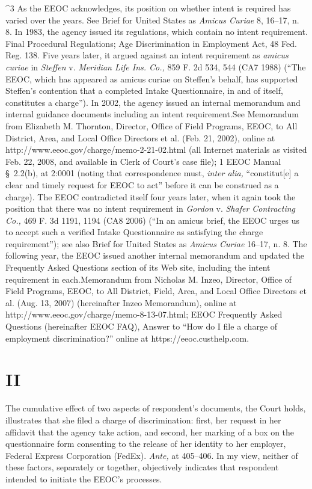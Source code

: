 ^3 As the EEOC acknowledges, its position on whether intent is required
has varied over the years. See Brief for United States as \emph{Amicus
Curiae} 8, 16--17, n. 8. In 1983, the agency issued its regulations,
which contain no intent requirement. Final Procedural Regulations;
Age Discrimination in Employment Act, 48 Fed. Reg. 138. Five years
later, it argued against an intent requirement as \emph{amicus curiae} in
\emph{Steffen} v. \emph{Meridian Life Ins. Co.,} 859 F. 2d 534, 544 (CA7
1988) (``The EEOC, which has appeared as amicus curiae on Steffen's
behalf, has supported Steffen's contention that a completed Intake
Questionnaire, in and of itself, constitutes a charge''). In
2002, the agency issued an internal memorandum and internal guidance
documents including an intent requirement.See Memorandum from
Elizabeth M. Thornton, Director, Office of Field Programs, EEOC, to
All District, Area, and Local Office Directors et al. (Feb. 21, 2002),
online at http://\newpage www.eeoc.gov/charge/memo-2-21-02.html (all
Internet materials as visited Feb. 22, 2008, and available in Clerk
of Court's case file); 1 EEOC Manual \S~2.2(b), at 2:0001 (noting
that correspondence must, \emph{inter alia,} ``constitut[e] a clear and
timely request for EEOC to act'' before it can be construed as a
charge). The EEOC contradicted itself four years later, when it again
took the position that there was no intent requirement in \emph{Gordon}
v. \emph{Shafer Contracting Co.,} 469 F. 3d 1191, 1194 (CA8 2006) (``In
an amicus brief, the EEOC urges us to accept such a verified Intake
Questionnaire as satisfying the charge requirement''); see also
Brief for United States as \emph{Amicus Curiae} 16--17, n. 8. The
following year, the EEOC issued another internal memorandum and updated
the Frequently Asked Questions section of its Web site, including
the intent requirement in each.Memorandum from Nicholas M. Inzeo,
Director, Office of Field Programs, EEOC, to All District, Field, Area,
and Local Office Directors et al. (Aug. 13, 2007) (hereinafter Inzeo
Memorandum), online at http://www.eeoc.gov/charge/memo-8-13-07.html;
EEOC Frequently Asked Questions (hereinafter EEOC FAQ), Answer to
``How do I file a charge of employment discrimination?'' online at
https://eeoc.custhelp.com.

\section{II}

  The cumulative effect of two aspects of respondent's documents, the
Court holds, illustrates that she filed a charge of discrimination:
first, her request in her affidavit that the agency take action, and
second, her marking of a box on the questionnaire form consenting to the
release of her identity to her employer, Federal Express Corporation
(FedEx). \emph{Ante,} at 405--406. In my view, neither of these
factors, separately or together, objectively indicates that respondent
intended to initiate the EEOC's processes.

